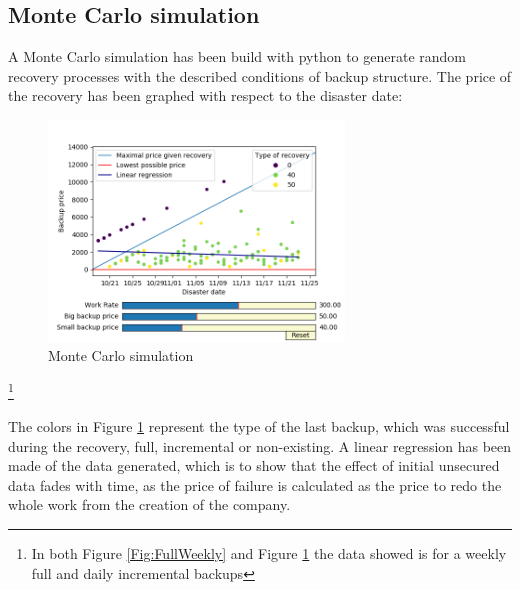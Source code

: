 \documentclass[11pt, a4paper]{article}
\theoremstyle{definition}
\newcommand\blfootnote[1]{%
	\begingroup
	\renewcommand\thefootnote{}\footnote{#1}%
	\addtocounter{footnote}{-1}%
	\endgroup
}
\begin{document}
		\subsection{Monte Carlo simulation}
			A Monte Carlo simulation has been build with python to generate random recovery processes with the described conditions of backup structure. The price of the recovery has been graphed with respect to the disaster date:
			\begin{figure}[H]
				\begin{minipage}{1.0\textwidth}
					\centering
					\includegraphics[width=0.7\textwidth]{"Weekly_full_carlo"}
					\caption{Monte Carlo simulation}\label{Fig:MonteCarlo}
				\end{minipage}
			\end{figure}
		\blfootnote{In both Figure \ref{Fig:FullWeekly} and Figure \ref{Fig:MonteCarlo} the data showed is for a weekly full and daily incremental backups}
		The colors in Figure \ref{Fig:MonteCarlo} represent the type of the last backup, which was successful during the recovery, full, incremental or non-existing.
		\newpage
		A linear regression has been made of the data generated, which is to show that the effect of initial unsecured data fades with time, as the price of failure is calculated as the price to redo the whole work from the creation of the company.
\end{document}
